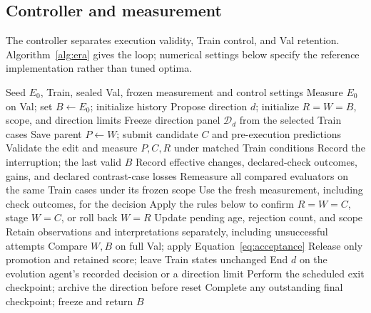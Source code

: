 \subsection{Controller and measurement}
The controller separates execution validity, Train control, and Val retention.
Algorithm~\ref{alg:era} gives the loop; numerical settings below specify the reference implementation rather than tuned optima.
\begin{algorithm}[htbp]
\caption{Direction development with reference updates and bounded exploration}
\label{alg:era}
\small
\begin{algorithmic}[1]
\Require Seed $E_0$, Train, sealed Val, frozen measurement and control settings
\State Measure $E_0$ on Val; set $B\gets E_0$; initialize history
  \State Propose direction $d$; initialize $R=W=B$, scope, and direction limits
  \State Freeze direction panel $\mathcal D_d$ from the selected Train cases
    \State Save parent $P\gets W$; submit candidate $C$ and pre-execution predictions
    \State Validate the edit and measure $P,C,R$ under matched Train conditions
      \State Record the interruption; \Return the last valid $B$
    \EndIf
    \State Record effective changes, declared-check outcomes, gains, and declared contrast-case losses
      \State Remeasure all compared evaluators on the same Train cases under its frozen scope
      \State Use the fresh measurement, including check outcomes, for the decision
    \EndIf
    \State Apply the rules below to confirm $R=W=C$, stage $W=C$, or roll back $W=R$
    \State Update pending age, rejection count, and scope
    \State Retain observations and interpretations separately, including unsuccessful attempts
      \State Compare $W,B$ on full Val; apply Equation~\ref{eq:acceptance}
      \State Release only promotion and retained score; leave Train states unchanged
    \EndIf
    \State End $d$ on the evolution agent's recorded decision or a direction limit
  \EndWhile
  \State Perform the scheduled exit checkpoint; archive the direction before reset
\EndWhile
\State Complete any outstanding final checkpoint; freeze and return $B$
\end{algorithmic}
\end{algorithm}



